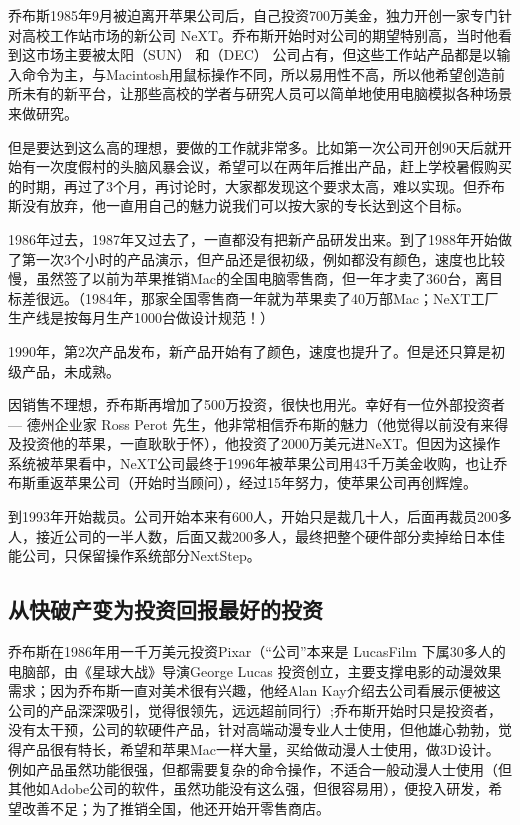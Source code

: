 乔布斯1985年9月被迫离开苹果公司后，自己投资700万美金，独力开创一家专门针对高校工作站市场的新公司 NeXT。乔布斯开始时对公司的期望特别高，当时他看到这市场主要被太阳（SUN） 和（DEC） 公司占有，但这些工作站产品都是以输入命令为主，与Macintosh用鼠标操作不同，所以易用性不高，所以他希望创造前所未有的新平台，让那些高校的学者与研究人员可以简单地使用电脑模拟各种场景来做研究。

但是要达到这么高的理想，要做的工作就非常多。比如第一次公司开创90天后就开始有一次度假村的头脑风暴会议，希望可以在两年后推出产品，赶上学校暑假购买的时期，再过了3个月，再讨论时，大家都发现这个要求太高，难以实现。但乔布斯没有放弃，他一直用自己的魅力说我们可以按大家的专长达到这个目标。

1986年过去，1987年又过去了，一直都没有把新产品研发出来。到了1988年开始做了第一次3个小时的产品演示，但产品还是很初级，例如都没有颜色，速度也比较慢，虽然签了以前为苹果推销Mac的全国电脑零售商，但一年才卖了360台，离目标差很远。（1984年，那家全国零售商一年就为苹果卖了40万部Mac；NeXT工厂生产线是按每月生产1000台做设计规范！）

1990年，第2次产品发布，新产品开始有了颜色，速度也提升了。但是还只算是初级产品，未成熟。

因销售不理想，乔布斯再增加了500万投资，很快也用光。幸好有一位外部投资者 --- 德州企业家 Ross Perot 先生，他非常相信乔布斯的魅力（他觉得以前没有来得及投资他的苹果，一直耿耿于怀），他投资了2000万美元进NeXT。但因为这操作系统被苹果看中，NeXT公司最终于1996年被苹果公司用43千万美金收购，也让乔布斯重返苹果公司（开始时当顾问），经过15年努力，使苹果公司再创辉煌。

到1993年开始裁员。公司开始本来有600人，开始只是裁几十人，后面再裁员200多人，接近公司的一半人数，后面又裁200多人，最终把整个硬件部分卖掉给日本佳能公司，只保留操作系统部分NextStep。

\hypertarget{ux4eceux5febux7834ux4ea7ux53d8ux4e3aux6295ux8d44ux56deux62a5ux6700ux597dux7684ux6295ux8d44}{%
\subsection{从快破产变为投资回报最好的投资}\label{ux4eceux5febux7834ux4ea7ux53d8ux4e3aux6295ux8d44ux56deux62a5ux6700ux597dux7684ux6295ux8d44}}

乔布斯在1986年用一千万美元投资Pixar（“公司”本来是 LucasFilm 下属30多人的电脑部，由《星球大战》导演George Lucas 投资创立，主要支撑电影的动漫效果需求；因为乔布斯一直对美术很有兴趣，他经Alan Kay介绍去公司看展示便被这公司的产品深深吸引，觉得很领先，远远超前同行）;乔布斯开始时只是投资者，没有太干预，公司的软硬件产品，针对高端动漫专业人士使用，但他雄心勃勃，觉得产品很有特长，希望和苹果Mac一样大量，买给做动漫人士使用，做3D设计。例如产品虽然功能很强，但都需要复杂的命令操作，不适合一般动漫人士使用（但其他如Adobe公司的软件，虽然功能没有这么强，但很容易用），便投入研发，希望改善不足；为了推销全国，他还开始开零售商店。

